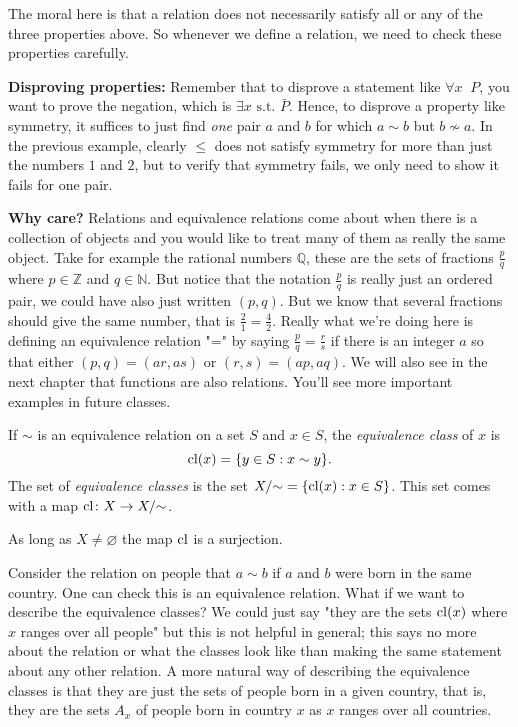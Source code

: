 \documentclass[11pt,dvipsnames]{book}
\numberwithin{figure}{section} %
\numberwithin{table}{section} %
\begin{document}
The moral here is that a relation does not necessarily satisfy all or any of the three properties above. So whenever we define a relation, we need to check these properties carefully.

\begin{protip}
{\bf Disproving properties:} Remember that to disprove a statement like $\forall x\;\; P$, you want to prove the negation, which is $\exists x\mbox{ s.t. } \bar{P}$. Hence, to disprove a property like symmetry, it suffices to just find {\it one} pair $a$ and $b$ for which $a\sim b$ but $b\not\sim a$. In the previous example, clearly $\leq  $ does not satisfy symmetry for more than just the numbers $1$ and $2$, but to verify that symmetry fails, we only need to show it fails for one pair.
\end{protip}

{\bf Why care?} Relations and equivalence relations come about when there is a collection of objects and you would like to treat many of them as really the same object. Take for example the rational numbers $\mathbb{Q}$, these are the sets of fractions $\frac{p}{q}$ where $p\in\mathbb{Z}$ and $q\in \mathbb{N}$. But notice that the notation $\frac{p}{q}$ is really just an ordered pair, we could have also just written $(p,q)$. But we know that several fractions should give the same number, that is $\frac{2}{1}=\frac{4}{2}$. Really what we're doing here is defining an equivalence relation "=" by saying $\frac{p}{q}=\frac{r}{s}$ if there is an integer $a$ so that either $(p,q)=(ar,as)$ or $(r,s)=(ap,aq)$. We will also see in the next chapter that functions are also relations. You'll see more important examples in future classes.

\def\cl{{\rm cl}}

\begin{definition}
If $\sim$ is an equivalence relation on a set $S$ and $x\in S$, the {\it equivalence class} of $x$ is
\[
\cl(x) = \{y\in S : x\sim y\}.
\]
The set of {\it equivalence classes} is the set $X/{\sim} = \{\cl(x) : x\in S\}$.
This set comes with a map $\cl \colon X \to X/{\sim}$.
\end{definition}

As long as $X \neq \varnothing$ the map $\cl$ is a surjection.

\begin{example}
Consider the relation on people that $a\sim b$ if $a$ and $b$ were born in the same country. One can check this is an equivalence relation. What if we want to describe the equivalence classes? We could just say "they are the sets $\cl(x)$ where $x$ ranges over all people" but this is not helpful in general; this says no more about the relation or what the classes look like than making the same statement about any other relation. A more natural way of describing the equivalence classes is that they are just the sets of people born in a given country, that is, they are the sets $A_x$ of people born in country $x$ as $x$ ranges over all countries.
\end{example}
\end{document}
